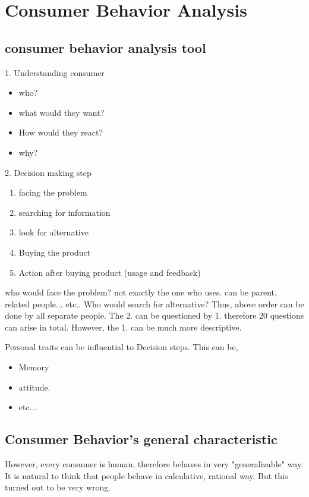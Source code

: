 \documentclass[12pt]{article}
\begin{document}
\section{Consumer Behavior Analysis}
\subsection{consumer behavior analysis tool}
1. Understanding consumer
\begin{itemize}
	\item who?
	\item what would they want?
	\item How would they react?
	\item why?
\end{itemize}

2. Decision making step
\begin{enumerate}
	\item facing the problem
	\item searching for information
	\item look for alternative
	\item Buying the product
	\item Action after buying product (usage and feedback)

\end{enumerate}

who would face the problem? not exactly the one who uses. can be parent, related people... etc..
Who would search for alternative? Thus, above order can be done by all separate people.
The 2. can be questioned by 1. therefore 20 questions can arise in total. However, the 1. can be much more descriptive.

Personal traits can be influential to Decision steps. This can be,
\begin{itemize}
	\item Memory
	\item attitude.
	\item etc...
\end{itemize}

\subsection{Consumer Behavior's general characteristic}

However, every consumer is human, therefore behaves in very "generalizable" way. It is natural to think that people behave in calculative, rational way. But this turned out to be very wrong.
\end{document}
